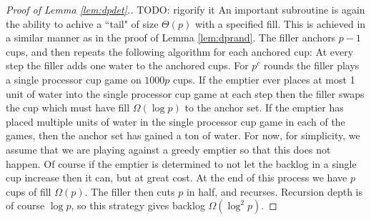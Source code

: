 \documentclass{article}[11pt]
\begin{document}
\begin{proof}[Proof of Lemma \ref{lem:dpdet}.]
  {\color{red} TODO: rigorify it}
  An important subroutine is again the ability to achive a ``tail" of size
  $\Theta(p)$ with a specified fill.  This is achieved in a similar manner as
  in the proof of Lemma \ref{lem:dprand}.  The filler anchors $p-1$ cups, and
  then repeats the following algorithm for each anchored cup: At every step the
  filler adds one water to the anchored cups. For $p^c$ rounds the filler
  plays a single processor cup game on $1000p$ cups. If the emptier ever places
  at most 1 unit of water into the single processor cup game at each step then
  the filler swaps the cup which must have fill $\Omega(\log p)$ to the anchor
  set.  If the emptier has placed multiple units of water in the single
  processor cup game in each of the games, then the anchor set has gained a ton
  of water. For now, for simplicity, we assume that we are playing against a
  greedy emptier so that this does not happen. Of course if the emptier is
  determined to not let the backlog in a single cup increase then it can, but
  at great cost.  At the end of this process we have $p$ cups of fill
  $\Omega(p)$.  The filler then cuts $p$ in half, and recurses.
  Recursion depth is of course $\log p$, so this strategy gives backlog
  $\Omega(\log^2 p)$.

\end{proof}
\end{document}
